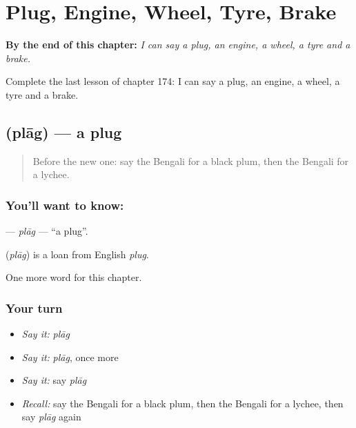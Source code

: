 
\chapter{Plug, Engine, Wheel, Tyre, Brake}
\label{ch:bn-plug-engine-wheel-tyre-brake}

\begin{chapteropening}
\textbf{By the end of this chapter:} \emph{I can say a plug, an engine, a wheel, a tyre and a brake.}

Complete the last lesson of chapter 174: I can say a plug, an engine, a wheel, a tyre and a brake.
\end{chapteropening}

\section[\texorpdfstring{\bn{প্লাগ} (plāg)}{প্লাগ (plāg)}]{ (plāg) — a plug}

\label{lesson:BN-C174-plag}



\begin{quote}
Before the new one: say the Bengali for a black plum, then the Bengali for a lychee.
\end{quote}

\subsection*{You'll want to know: }
\textbf{} — \emph{plāg} — \textquotedblleft{}a plug\textquotedblright{}.

\begin{cousinweb}
\textbf{} (\emph{plāg}) is a loan from English \emph{plug}.
\end{cousinweb}

\begin{grammarlens}[title={What you've built}]
One more word for this chapter.
\end{grammarlens}

\subsection*{Your turn}
\begin{itemize}
\raggedright
  \item \emph{Say it:} \emph{plāg}
  \item \emph{Say it:} \emph{plāg}, once more
  \item \emph{Say it:} say \emph{plāg}
  \item \emph{Recall:} say the Bengali for a black plum, then the Bengali for a lychee, then say \emph{plāg} again
\end{itemize}


